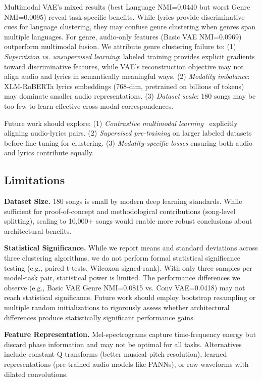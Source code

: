 \documentclass[10pt,twocolumn]{article}
\begin{document}
Multimodal VAE's mixed results (best Language NMI=0.0440 but worst Genre NMI=0.0095) reveal task-specific benefits. While lyrics provide discriminative cues for language clustering, they may confuse genre clustering when genres span multiple languages. For genre, audio-only features (Basic VAE NMI=0.0969) outperform multimodal fusion. We attribute genre clustering failure to: (1) \emph{Supervision vs. unsupervised learning}: labeled training provides explicit gradients toward discriminative features, while VAE's reconstruction objective may not align audio and lyrics in semantically meaningful ways. (2) \emph{Modality imbalance}: XLM-RoBERTa lyrics embeddings (768-dim, pretrained on billions of tokens) may dominate smaller audio representations. (3) \emph{Dataset scale}: 180 songs may be too few to learn effective cross-modal correspondences.

Future work should explore: (1) \emph{Contrastive multimodal learning}~\cite{huang2022mulan} explicitly aligning audio-lyrics pairs. (2) \emph{Supervised pre-training} on larger labeled datasets before fine-tuning for clustering. (3) \emph{Modality-specific losses} ensuring both audio and lyrics contribute equally.

\subsection{Limitations}

\textbf{Dataset Size.} 180 songs is small by modern deep learning standards. While sufficient for proof-of-concept and methodological contributions (song-level splitting), scaling to 10,000+ songs would enable more robust conclusions about architectural benefits.

\textbf{Statistical Significance.} While we report means and standard deviations across three clustering algorithms, we do not perform formal statistical significance testing (e.g., paired t-tests, Wilcoxon signed-rank). With only three samples per model-task pair, statistical power is limited. The performance differences we observe (e.g., Basic VAE Genre NMI=0.0815 vs. Conv VAE=0.0418) may not reach statistical significance. Future work should employ bootstrap resampling or multiple random initializations to rigorously assess whether architectural differences produce statistically significant performance gains.

\textbf{Feature Representation.} Mel-spectrograms capture time-frequency energy but discard phase information and may not be optimal for all tasks. Alternatives include constant-Q transforms (better musical pitch resolution), learned representations (pre-trained audio models like PANNs), or raw waveforms with dilated convolutions.
\end{document}
